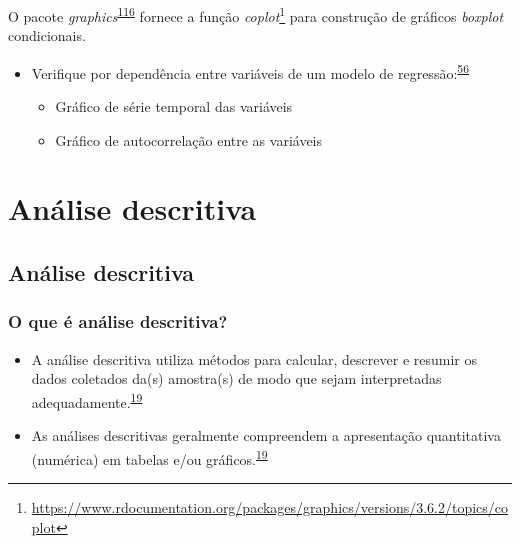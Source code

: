 \documentclass[
]{book}
\renewcommand{\href}[2]{#2\footnote{\url{#1}}}
\newenvironment{infobox}[1]
  {
  \begin{itemize}
  \renewcommand{\labelitemi}{
    \raisebox{-.7\height}[0pt][0pt]{
      {\setkeys{Gin}{width=3em,keepaspectratio}
        \texttt{[image: \#1]}}
    }
  }
  \setlength{\fboxsep}{1em}
  \begin{blackbox}
  \item
  }
  {
  \end{blackbox}
  \end{itemize}
  }
\begin{document}
\begin{infobox}{images/Rlogo}
O pacote \emph{graphics}\textsuperscript{\protect\hyperlink{ref-graphics}{116}} fornece a função \href{https://www.rdocumentation.org/packages/graphics/versions/3.6.2/topics/coplot}{\emph{coplot}} para construção de gráficos \emph{boxplot} condicionais.

\end{infobox}

\begin{itemize}
\item
  Verifique por dependência entre variáveis de um modelo de regressão:\textsuperscript{\protect\hyperlink{ref-zuur2009}{56}}

  \begin{itemize}
  \item
    Gráfico de série temporal das variáveis
  \item
    Gráfico de autocorrelação entre as variáveis
  \end{itemize}
\end{itemize}

\hypertarget{analise-descritiva}{%
\chapter{\texorpdfstring{\textbf{Análise descritiva}}{Análise descritiva}}\label{analise-descritiva}}

\hypertarget{descritiva}{%
\section{Análise descritiva}\label{descritiva}}

\hypertarget{o-que-uxe9-anuxe1lise-descritiva}{%
\subsection{O que é análise descritiva?}\label{o-que-uxe9-anuxe1lise-descritiva}}

\begin{itemize}
\item
  A análise descritiva utiliza métodos para calcular, descrever e resumir os dados coletados da(s) amostra(s) de modo que sejam interpretadas adequadamente.\textsuperscript{\protect\hyperlink{ref-vetter2017}{19}}
\item
  As análises descritivas geralmente compreendem a apresentação quantitativa (numérica) em tabelas e/ou gráficos.\textsuperscript{\protect\hyperlink{ref-vetter2017}{19}}
\end{itemize}
\end{document}
